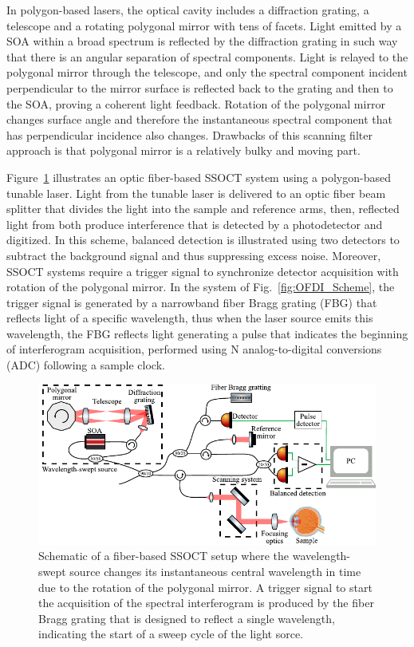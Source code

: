 In polygon-based lasers, the optical cavity includes a diffraction grating, a telescope and a rotating polygonal mirror with tens of facets. Light emitted by a SOA within a broad spectrum is reflected by the diffraction grating in such way that there is an angular separation of spectral components. Light is relayed to the polygonal mirror through the telescope, and only the spectral component incident perpendicular to the mirror surface is reflected back to the grating and then to the SOA, proving a coherent light feedback. Rotation of the polygonal mirror changes surface angle and therefore the instantaneous spectral component that has perpendicular incidence also changes. Drawbacks of this scanning filter approach is that polygonal mirror is a relatively bulky and moving part.

Figure~\ref{fig:SSOCT_Scheme} illustrates an optic fiber-based SSOCT system using a polygon-based tunable laser. Light from the tunable laser is delivered to an optic fiber beam splitter that divides the light into the sample and reference arms, then, reflected light from both produce interference that is detected by a photodetector and digitized. In this scheme, balanced detection is illustrated using two detectors to subtract the background signal and thus suppressing excess noise. Moreover, SSOCT systems require a trigger signal to synchronize detector acquisition with rotation of the polygonal mirror. In the system of Fig.~\ref{fig:OFDI_Scheme}, the trigger signal is generated by a narrowband fiber Bragg grating (FBG) that reflects light of a specific wavelength, thus when the laser source emits this wavelength, the FBG reflects light generating a pulse that indicates the beginning of interferogram acquisition, performed using N analog-to-digital conversions (ADC) following a sample clock.

\begin{figure}[htb!]
    \centering
    \includegraphics[width=\textwidth]{Figures/TheoreticalBasis/SSOCT_Scheme.pdf}
    \caption{Schematic of a fiber-based SSOCT setup where the wavelength-swept source changes its instantaneous central wavelength in time due to the rotation of the polygonal mirror. A trigger signal to start the acquisition of the spectral interferogram is produced by the fiber Bragg grating that is designed to reflect a single wavelength, indicating the start of a sweep cycle of the light sorce.}
    \label{fig:SSOCT_Scheme}
\end{figure}

